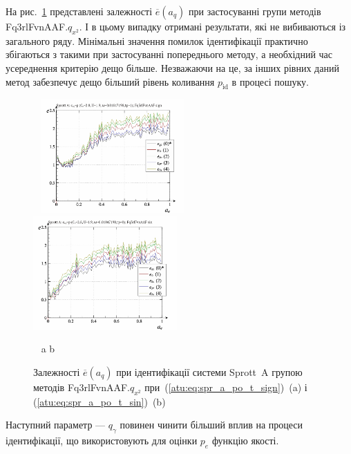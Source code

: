 На рис.~\ref{atu:f:spr_a_a_q_Fq3rlFvnAAF_q_x2} представлені залежності
$\overline{e} (a_q)$ при застосуванні групи методів Fq3rlFvnAAF.$q_{x^2}$.
І в цьому випадку отримані результати, які не
вибиваються із загального ряду. Мінімальні значення помилок
ідентифікації практично збігаються з такими при застосуванні
попереднього методу, а необхідний час усереднення критерію
дещо більше. Незважаючи на це, за інших рівних даний метод
забезпечує дещо більший рівень коливання
$p_\mathrm{id}$ в процесі пошуку.


\begin{figure}[htb!]
\begin{center}
  ~ \hfill
    \includegraphics[width=0.49\textwidth]{p/cha/spr_a/Fq3rlFvnAAF_x2/sprott_a_id-p_a_q_sign.png}
    \hfill
    \includegraphics[width=0.49\textwidth]{p/cha/spr_a/Fq3rlFvnAAF_x2/sprott_a_id-p_a_q_sin.png}
  \hfill ~
\end{center}
  \vspace{-1.0ex}
  \begin{center}
    ~ \hfill a \hfill\hfill b \hfill ~
  \end{center}
  \caption{Залежності $\overline{e}(a_q)$ при ідентифікації системи Sprott~A групою методів Fq3rlFvnAAF.$q_{x^2}$ при~(\ref{atu:eq:spr_a_po_t_sign})~(a) і (\ref{atu:eq:spr_a_po_t_sin})~(b)}
  \label{atu:f:spr_a_a_q_Fq3rlFvnAAF_q_x2}
\end{figure}

Наступний параметр ---
$q_\gamma$ повинен чинити більший вплив на процеси ідентифікації,
що використовують для оцінки
$p_e$ функцію якості.

